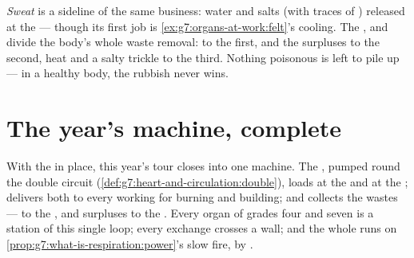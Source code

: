 \begin{remark}\label{rem:g7:removing-wastes:sweat}
\emph{Sweat} is a sideline of the same
business: water and salts (with traces of ) released
at the  --- though its first job is
\cref{ex:g7:organs-at-work:felt}'s cooling. The ,
 and  divide the body's whole waste removal:
 to the first,  and the surpluses to
the second, heat and a salty trickle to the third.
Nothing poisonous is left to pile up --- in a healthy
body, the rubbish never wins.
\end{remark}

\section{The year's machine, complete}

\begin{proposition}\label{prop:g7:removing-wastes:complete}
With the  in place, this year's tour closes into
one machine. The , pumped round the double circuit
(\cref{def:g7:heart-and-circulation:double}), loads
 at the  and  at the ;
delivers both to every working  for burning and
building; and collects the wastes ---  to
the ,  and surpluses to the . Every organ
of grades four and seven is a station of this single
loop; every exchange crosses a  wall; and the
whole runs on \cref{prop:g7:what-is-respiration:power}'s
slow fire,  by .
\end{proposition}
\admitted

